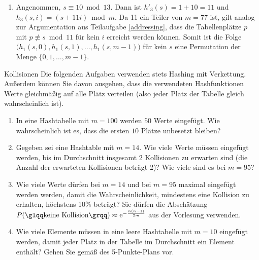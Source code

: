 \documentclass[11pt,a4paper]{article}
\begin{document}
\begin{loesung}
\begin{enumerate}
\begin{enumerate}[label=\roman*)]
            \item Angenommen, $s \equiv 10 \bmod 13$.
            Dann ist $h'_3(s) = 1 + 10 = 11$ und $h_3(s, i) = (s + 11i) \bmod m$.
            Da 11 ein Teiler von $m = 77$ ist, gilt analog zur Argumentation aus Teilaufgabe \ref*{addressing}, dass die Tabellenplätze $p$ mit $p \not\equiv s \bmod 11$ für kein $i$ erreicht werden können.
            Somit ist die Folge $\big(h_1(s, 0), h_1(s, 1), \ldots, h_1(s, m - 1)\big)$ für kein $s$ eine Permutation der Menge $\{0, 1, \ldots, m - 1\}$.
        \end{enumerate}
    \end{enumerate}
\end{loesung}

\begin{aufgabe}{2}{Kollisionen}
    Die folgenden Aufgaben verwenden stets Hashing mit Verkettung.
    Außerdem können Sie davon ausgehen, dass die verwendeten Hashfunktionen Werte gleichmäßig auf alle Plätz verteilen (also jeder Platz der Tabelle gleich wahrscheinlich ist).
    \begin{enumerate}
        \item In eine Hashtabelle mit $m = 100$ werden $50$ Werte eingefügt.
        Wie wahrscheinlich ist es, dass die ersten $10$ Plätze unbesetzt bleiben?
        \item Gegeben sei eine Hashtable mit $m = 14$. Wie viele Werte müssen eingefügt werden, bis im Durchschnitt insgesamt 2 Kollisionen zu erwarten sind (die Anzahl der erwarteten Kollisionen beträgt 2)?
        Wie viele sind es bei $m = 95$?
        \item Wie viele Werte dürfen bei $m = 14$ und bei $m = 95$ maximal eingefügt werden werden, damit die Wahrscheinlichkeit, mindestens eine Kollision zu erhalten, höchstens 10\% beträgt?
        Sie dürfen die Abschätzung $P(\text{\quotes{keine Kollision}}) \approx \mathrm{e}^{-\frac{n (n - 1)}{2m}}$ aus der Vorlesung verwenden.
        \item Wie viele Elemente müssen in eine leere Hashtabelle mit $m = 10$ eingefügt werden, damit jeder Platz in der Tabelle im Durchschnitt ein Element enthält? Gehen Sie gemäß des \glqq{}5-Punkte-Plans\grqq{} vor.
    \end{enumerate}
\end{aufgabe}
\end{document}
